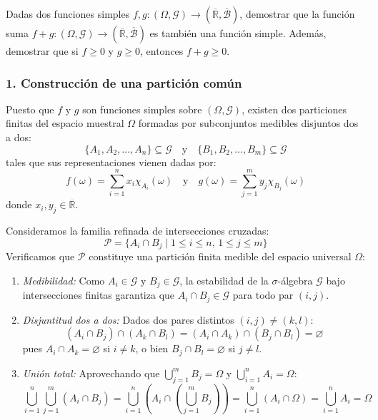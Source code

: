 \begin{problema}
Dadas dos funciones simples $f, g : (\Omega, \mathcal{G}) \to (\overline{\mathbb{R}}, \overline{\mathcal{B}})$, demostrar que la función suma $f + g : (\Omega, \mathcal{G}) \to (\overline{\mathbb{R}}, \overline{\mathcal{B}})$ es también una función simple. Además, demostrar que si $f \ge 0$ y $g \ge 0$, entonces $f + g \ge 0$.

\tcblower

\subsubsection*{1. Construcción de una partición común}
Puesto que $f$ y $g$ son funciones simples sobre $(\Omega, \mathcal{G})$, existen dos particiones finitas del espacio muestral $\Omega$ formadas por subconjuntos medibles disjuntos dos a dos:
\[
    \{A_1, A_2, \dots, A_n\} \subseteq \mathcal{G} \quad \text{y} \quad \{B_1, B_2, \dots, B_m\} \subseteq \mathcal{G}
\]
tales que sus representaciones vienen dadas por:
\[
    f(\omega) = \sum_{i=1}^n x_i \chi_{A_i}(\omega) \quad \text{y} \quad g(\omega) = \sum_{j=1}^m y_j \chi_{B_j}(\omega)
\]
donde $x_i, y_j \in \overline{\mathbb{R}}$.

Consideramos la familia refinada de intersecciones cruzadas:
\[
    \mathcal{P} = \{ A_i \cap B_j \mid 1 \le i \le n, \, 1 \le j \le m \}
\]
Verificamos que $\mathcal{P}$ constituye una partición finita medible del espacio universal $\Omega$:
\begin{enumerate}[label=\arabic*.]
    \item \textit{Medibilidad:} Como $A_i \in \mathcal{G}$ y $B_j \in \mathcal{G}$, la estabilidad de la $\sigma$-álgebra $\mathcal{G}$ bajo intersecciones finitas garantiza que $A_i \cap B_j \in \mathcal{G}$ para todo par $(i, j)$.
    \item \textit{Disjuntitud dos a dos:} Dados dos pares distintos $(i, j) \neq (k, l)$:
    \[
        (A_i \cap B_j) \cap (A_k \cap B_l) = (A_i \cap A_k) \cap (B_j \cap B_l) = \varnothing
    \]
    pues $A_i \cap A_k = \varnothing$ si $i \neq k$, o bien $B_j \cap B_l = \varnothing$ si $j \neq l$.
    \item \textit{Unión total:} Aprovechando que $\bigcup_{j=1}^m B_j = \Omega$ y $\bigcup_{i=1}^n A_i = \Omega$:
    \[
        \bigcup_{i=1}^n \bigcup_{j=1}^m (A_i \cap B_j) = \bigcup_{i=1}^n \left( A_i \cap \left( \bigcup_{j=1}^m B_j \right) \right) = \bigcup_{i=1}^n (A_i \cap \Omega) = \bigcup_{i=1}^n A_i = \Omega
    \]
\end{enumerate}


\end{problema}
